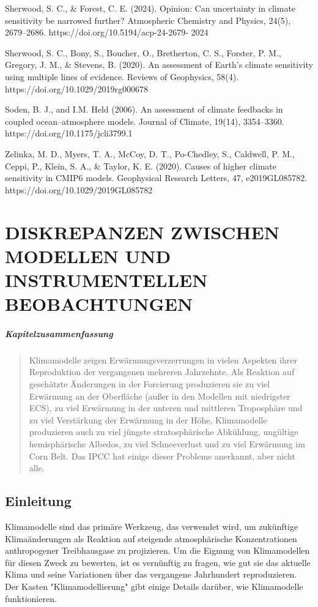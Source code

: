 \documentclass[12pt,paper=a4,DIV=12,parskip=never,chapterprefix=false,headings=standardclasses]{scrreprt}
\begin{document}
Sherwood, S. C., \& Forest, C. E. (2024). Opinion: Can uncertainty in climate sensitivity be narrowed
further? Atmospheric Chemistry and Physics, 24(5), 2679–2686. https://doi.org/10.5194/acp-24-2679-
2024

Sherwood, S. C., Bony, S., Boucher, O., Bretherton, C. S., Forster, P. M., Gregory, J. M., \& Stevens, B.
(2020). An assessment of Earth's climate sensitivity using multiple lines of evidence. Reviews of
Geophysics, 58(4). https://doi.org/10.1029/2019rg000678

Soden, B. J., and I.M. Held (2006). An assessment of climate feedbacks in coupled ocean–atmosphere
models. Journal of Climate, 19(14), 3354–3360. https://doi.org/10.1175/jcli3799.1

Zelinka, M. D., Myers, T. A., McCoy, D. T., Po-Chedley, S., Caldwell, P. M., Ceppi, P., Klein, S. A., \&
Taylor, K. E. (2020). Causes of higher climate sensitivity in CMIP6 models. Geophysical Research
Letters, 47, e2019GL085782. https://doi.org/10.1029/2019GL085782
\endgroup

\cleardoublepage
\chapter{DISKREPANZEN ZWISCHEN MODELLEN UND INSTRUMENTELLEN BEOBACHTUNGEN}
\paragraph{Kapitelzusammenfassung}
\begin{quote}
Klimamodelle zeigen Erwärmungsverzerrungen in vielen Aspekten ihrer Reproduktion der vergangenen mehreren Jahrzehnte. Als Reaktion auf geschätzte Änderungen in der Forcierung produzieren sie zu viel Erwärmung an der Oberfläche (außer in den Modellen mit niedrigster ECS), zu viel Erwärmung in der unteren und mittleren Troposphäre und zu viel Verstärkung der Erwärmung in der Höhe.
Klimamodelle produzieren auch zu viel jüngste stratosphärische Abkühlung, ungültige hemisphärische Albedos, zu viel Schneeverlust und zu viel Erwärmung im Corn Belt. Das IPCC hat einige dieser Probleme anerkannt, aber nicht alle.
\end{quote}

\section{Einleitung}
Klimamodelle sind das primäre Werkzeug, das verwendet wird, um zukünftige Klimaänderungen als Reaktion auf steigende atmosphärische Konzentrationen anthropogener Treibhausgase zu projizieren. Um die Eignung von Klimamodellen für diesen Zweck zu bewerten, ist es vernünftig zu fragen, wie gut sie das aktuelle Klima und seine Variationen über das vergangene Jahrhundert reproduzieren. Der Kasten "Klimamodellierung" gibt einige Details darüber, wie Klimamodelle funktionieren.
\end{document}

